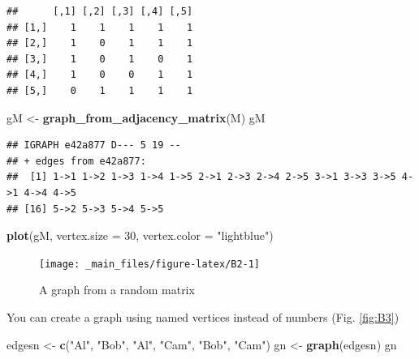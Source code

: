 \documentclass[
]{book}
\newenvironment{Shaded}{\begin{snugshade}}{\end{snugshade}}
\newcommand{\AttributeTok}[1]{\textcolor[rgb]{0.13,0.29,0.53}{#1}}
\newcommand{\DecValTok}[1]{\textcolor[rgb]{0.00,0.00,0.81}{#1}}
\newcommand{\FunctionTok}[1]{\textcolor[rgb]{0.13,0.29,0.53}{\textbf{#1}}}
\newcommand{\NormalTok}[1]{#1}
\newcommand{\OtherTok}[1]{\textcolor[rgb]{0.56,0.35,0.01}{#1}}
\newcommand{\StringTok}[1]{\textcolor[rgb]{0.31,0.60,0.02}{#1}}
\theoremstyle{definition}
\theoremstyle{definition}
\theoremstyle{definition}
\theoremstyle{definition}
\theoremstyle{remark}
\begin{document}
\begin{verbatim}
##      [,1] [,2] [,3] [,4] [,5]
## [1,]    1    1    1    1    1
## [2,]    1    0    1    1    1
## [3,]    1    0    1    0    1
## [4,]    1    0    0    1    1
## [5,]    0    1    1    1    1
\end{verbatim}

\begin{Shaded}
\begin{Highlighting}[]
\NormalTok{gM }\OtherTok{\textless{}{-}} \FunctionTok{graph\_from\_adjacency\_matrix}\NormalTok{(M)}
\NormalTok{gM}
\end{Highlighting}
\end{Shaded}

\begin{verbatim}
## IGRAPH e42a877 D--- 5 19 -- 
## + edges from e42a877:
##  [1] 1->1 1->2 1->3 1->4 1->5 2->1 2->3 2->4 2->5 3->1 3->3 3->5 4->1 4->4 4->5
## [16] 5->2 5->3 5->4 5->5
\end{verbatim}

\begin{Shaded}
\begin{Highlighting}[]
\FunctionTok{plot}\NormalTok{(gM, }\AttributeTok{vertex.size =} \DecValTok{30}\NormalTok{, }\AttributeTok{vertex.color =} \StringTok{"lightblue"}\NormalTok{)}
\end{Highlighting}
\end{Shaded}

\begin{figure}

{\centering \texttt{[image: \_main\_files/figure-latex/B2-1]} 

}

\caption{A graph from a random matrix}\label{fig:B2}
\end{figure}

You can create a graph using named vertices instead of numbers (Fig. \ref{fig:B3})

\begin{Shaded}
\begin{Highlighting}[]
\NormalTok{edgesn }\OtherTok{\textless{}{-}} \FunctionTok{c}\NormalTok{(}\StringTok{"Al"}\NormalTok{, }\StringTok{"Bob"}\NormalTok{, }\StringTok{"Al"}\NormalTok{, }\StringTok{"Cam"}\NormalTok{, }\StringTok{"Bob"}\NormalTok{, }\StringTok{"Cam"}\NormalTok{)}
\NormalTok{gn }\OtherTok{\textless{}{-}} \FunctionTok{graph}\NormalTok{(edgesn)}
\NormalTok{gn}
\end{Highlighting}
\end{Shaded}
\end{document}
